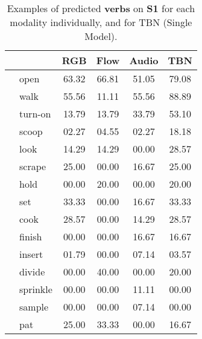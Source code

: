\documentclass[10pt,twocolumn,letterpaper]{article}
\begin{document}
\begin{table}[t!]
    \centering
    {\begin{tabular}{ll|c|c|c|c}
         & &  RGB & Flow & Audio & TBN\\
         \hline
        \rowcolor{gray}
         & open & 63.32 & 66.81 & 51.05 & 79.08\\
         \rowcolor{gray}
         & walk & 55.56 & 11.11 & 55.56 & 88.89\\
        \rowcolor{gray}
         & turn-on & 13.79 & 13.79 & 33.79 & 53.10\\
         \rowcolor{gray}
         & scoop & 02.27 & 04.55 & 02.27 & 18.18\\
         \rowcolor{gray}
         & look & 14.29 & 14.29 & 00.00 & 28.57\\
         \rowcolor{mediumgray}
         & scrape & 25.00 & 00.00 & 16.67 & 25.00\\
         \rowcolor{mediumgray}
         & hold & 00.00 & 20.00 & 00.00 & 20.00\\
         \rowcolor{mediumgray}
         & set & 33.33 & 00.00 & 16.67 & 33.33\\
         \rowcolor{mediumgray}
         & cook & 28.57 & 00.00 & 14.29 & 28.57\\
         \rowcolor{mediumgray}
         & finish & 00.00 & 00.00 & 16.67 & 16.67\\
         \rowcolor{lightgray}
         & insert & 01.79 & 00.00 & 07.14 & 03.57\\
         \rowcolor{lightgray}
         & divide & 00.00 & 40.00 & 00.00 & 20.00\\
         \rowcolor{lightgray}
         & sprinkle & 00.00 & 00.00 & 11.11 & 00.00\\
         \rowcolor{lightgray}
         & sample & 00.00 & 00.00 & 07.14 & 00.00\\
         \rowcolor{lightgray}
         & pat & 25.00 & 33.33 & 00.00 & 16.67
    \end{tabular}}
    \caption{Examples of predicted \textbf{verbs} on \textbf{S1} for each modality individually, and for TBN (Single Model).}
    \label{tab:verbs}
\end{table}
\end{document}
